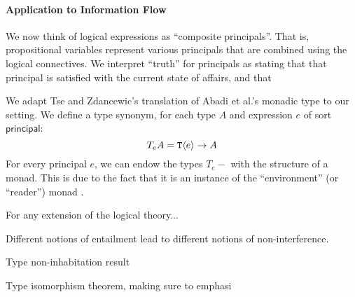 \paragraph{Application to Information Flow}
We now think of logical expressions as ``composite principals''. That
is, propositional variables represent various principals that are
combined using the logical connectives. We interpret ``truth'' for
principals as stating that that principal is satisfied with the
current state of affairs, and that 


We adapt Tse and
Zdancewic's translation of Abadi et al.'s monadic type to our
setting. We define a type synonym, for each type $A$ and expression
$e$ of sort $\mathsf{principal}$:
\begin{displaymath}
  T_eA = \textup{\texttt{T}}\langle e \rangle \to A
\end{displaymath}
For every principal $e$, we can endow the types $T_e-$ with the
structure of a monad. This is due to the fact that it is an instance
of the ``environment'' (or ``reader'') monad \cite{jones95functional}.

For any extension of the logical theory...


\begin{example}
  Different notions of entailment lead to different notions of
  non-interference.
\end{example}

\begin{theorem}
  Type non-inhabitation result
\end{theorem}

\begin{theorem}
  Type isomorphism theorem, making sure to emphasi
\end{theorem}








